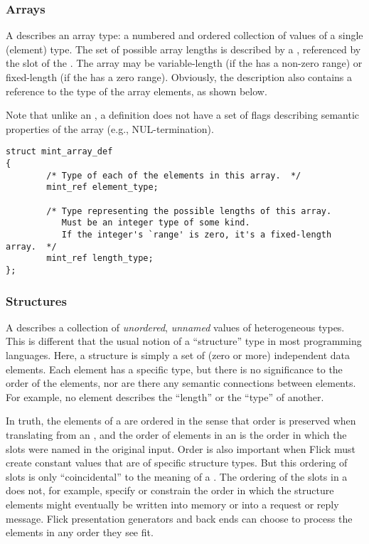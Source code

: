 \subsubsection{Arrays}

A  describes an array type: a numbered and ordered collection
of values of a single (element) type.  The set of possible array lengths is
described by a , referenced by the  slot of
the .  The array may be variable-length (if the
 has a non-zero range) or fixed-length (if the
 has a zero range).  Obviously, the 
description also contains a reference to the type of the array elements, as
shown below.

Note that unlike an , a  definition does not
have a set of flags describing semantic properties of the array (e.g.,
NUL-termination).

\begin{verbatim}
struct mint_array_def
{
        /* Type of each of the elements in this array.  */
        mint_ref element_type;

        /* Type representing the possible lengths of this array.
           Must be an integer type of some kind.
           If the integer's `range' is zero, it's a fixed-length array.  */
        mint_ref length_type;
};
\end{verbatim}


\subsubsection{Structures}

A  describes a collection of \emph{unordered}, \emph{unnamed}
values of heterogeneous types.  This is different that the usual notion of a
``structure'' type in most programming languages.  Here, a structure is simply
a set of (zero or more) independent data elements.  Each element has a specific
type, but there is no significance to the order of the elements, nor are there
any semantic connections between elements.  For example, no element describes
the ``length'' or the ``type'' of another.

In truth, the elements of a  are ordered in the sense that
order is preserved when translating from an , and the order of
elements in an  is the order in which the slots were named in
the original \IDL{} input.  Order is also important when Flick must create
constant values that are of specific structure types.  But this ordering of
slots is only ``coincidental'' to the meaning of a .  The
ordering of the slots in a  does not, for example, specify or
constrain the order in which the structure elements might eventually be written
into memory or into a request or reply message.  Flick presentation generators
and back ends can choose to process the  elements in any order
they see fit.

